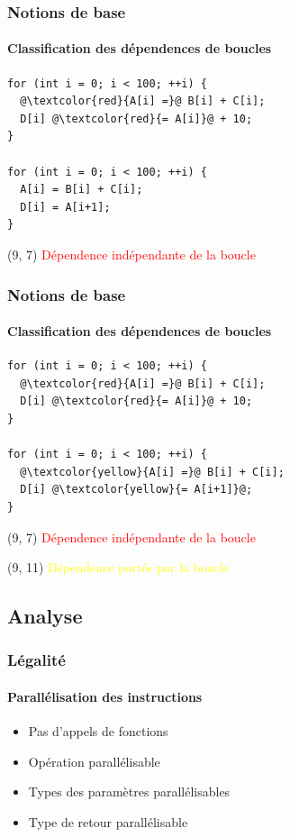 \documentclass{beamer}
\begin{document}
\begin{frame}[fragile]
\frametitle{Notions de base}
\framesubtitle{Classification des dépendences de boucles}
\begin{lstlisting}
for (int i = 0; i < 100; ++i) {
  @\textcolor{red}{A[i] =}@ B[i] + C[i];
  D[i] @\textcolor{red}{= A[i]}@ + 10;
}

for (int i = 0; i < 100; ++i) {
  A[i] = B[i] + C[i];
  D[i] = A[i+1];
}
\end{lstlisting}

\begin{textblock}{5.5}(9, 7)
	\textcolor{red}{Dépendence indépendante de la boucle}
\end{textblock}
\end{frame}

\begin{frame}[fragile]
\frametitle{Notions de base}
\framesubtitle{Classification des dépendences de boucles}
\begin{lstlisting}
for (int i = 0; i < 100; ++i) {
  @\textcolor{red}{A[i] =}@ B[i] + C[i];
  D[i] @\textcolor{red}{= A[i]}@ + 10;
}

for (int i = 0; i < 100; ++i) {
  @\textcolor{yellow}{A[i] =}@ B[i] + C[i];
  D[i] @\textcolor{yellow}{= A[i+1]}@;
}
\end{lstlisting}

\begin{textblock}{5.5}(9, 7)
	\textcolor{red}{Dépendence indépendante de la boucle}
\end{textblock}

\begin{textblock}{5}(9, 11)
	\textcolor{yellow}{Dépendence portée par la boucle}
\end{textblock}
\end{frame}

\subsection{Analyse}
\begin{frame}
\frametitle{Légalité}
\framesubtitle{Parallélisation des instructions}
\begin{itemize}
\item Pas d'appels de fonctions
\item Opération parallélisable
\item Types des paramètres parallélisables
\item Type de retour parallélisable
\end{itemize}
\end{frame}
\end{document}
